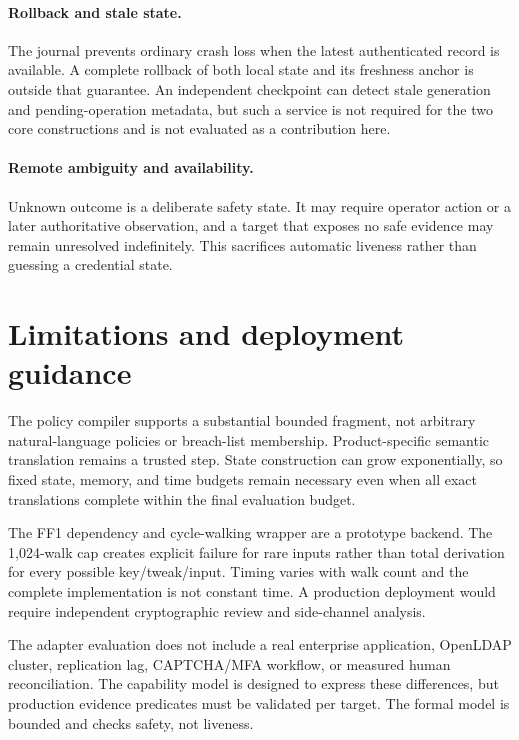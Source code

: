 \documentclass[preprint,12pt]{elsarticle}
\begin{document}
\paragraph{Rollback and stale state.}
The journal prevents ordinary crash loss when the latest authenticated record is
available. A complete rollback of both local state and its freshness anchor is
outside that guarantee. An independent checkpoint can detect stale generation
and pending-operation metadata, but such a service is not required for the two
core constructions and is not evaluated as a contribution here.

\paragraph{Remote ambiguity and availability.}
Unknown outcome is a deliberate safety state. It may require operator action or
a later authoritative observation, and a target that exposes no safe evidence
may remain unresolved indefinitely. This sacrifices automatic liveness rather
than guessing a credential state.

\section{Limitations and deployment guidance}

The policy compiler supports a substantial bounded fragment, not arbitrary
natural-language policies or breach-list membership. Product-specific semantic
translation remains a trusted step. State construction can grow exponentially,
so fixed state, memory, and time budgets remain necessary even when all exact
translations complete within the final evaluation budget.

The FF1 dependency and cycle-walking wrapper are a prototype backend. The
1,024-walk cap creates explicit failure for rare inputs rather than total
derivation for every possible key/tweak/input. Timing varies with walk count and
the complete implementation is not constant time. A production deployment
would require independent cryptographic review and side-channel analysis.

The adapter evaluation does not include a real enterprise application,
OpenLDAP cluster, replication lag, CAPTCHA/MFA workflow, or measured human
reconciliation. The capability model is designed to express these differences,
but production evidence predicates must be validated per target. The formal
model is bounded and checks safety, not liveness.
\end{document}
